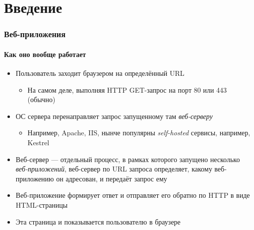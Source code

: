 \documentclass{../../slides-style}
\begin{document}
    \section{Введение}

    \begin{frame}
        \frametitle{Веб-приложения}
        \framesubtitle{Как оно вообще работает}
        \begin{itemize}
            \item Пользователь заходит браузером на определённый URL
            \begin{itemize}
                \item На самом деле, выполняя HTTP GET-запрос на порт 80 или 443 (обычно)
            \end{itemize}
            \item ОС сервера перенаправляет запрос запущенному там \emph{веб-серверу}
            \begin{itemize}
                \item Например, Apache, IIS, нынче популярны \emph{self-hosted} сервисы, например, Kestrel
            \end{itemize}
            \item Веб-сервер --- отдельный процесс, в рамках которого запущено несколько \emph{веб-приложений}, веб-сервер по URL запроса определяет, какому веб-приложению он адресован, и передаёт запрос ему
            \item Веб-приложение формирует ответ и отправляет его обратно по HTTP в виде HTML-страницы
            \item Эта страница и показывается пользователю в браузере
        \end{itemize}
    \end{frame}
\end{document}

